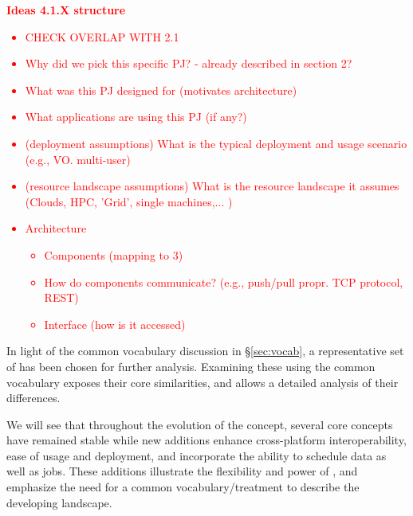 \documentclass{sig-alternate}
\begin{document}
\textcolor{red}
{
\textbf{Ideas 4.1.X structure}
\begin{itemize}
\item CHECK OVERLAP WITH 2.1
\item Why did we pick this specific PJ? - already described in section 2?
\item What was this PJ designed for (motivates architecture)
\item What applications are using this PJ (if any?)
\item (deployment assumptions) What is the typical deployment and usage scenario (e.g., VO. multi-user)
\item (resource landscape assumptions) What is the resource landscape it assumes (Clouds, HPC, 'Grid', single machines,... )
\item Architecture
  \begin{itemize}
    \item Components (mapping to 3)
    \item How do components communicate? (e.g., push/pull propr. TCP protocol, REST)
    \item Interface (how is it accessed)
  \end{itemize}
\end{itemize}
}


In light of the common vocabulary discussion in \S\ref{sec:vocab}, a
representative set of \pilotjobs has been chosen for further analysis.
Examining these \pilotjobs using the common vocabulary exposes their
core similarities, and allows a detailed analysis of their
differences.

We will see that throughout the evolution of the \pilotjob concept,
several core concepts have remained stable while new additions enhance
cross-platform interoperability, ease of usage and deployment, and
incorporate the ability to schedule data as well as jobs.  These
additions illustrate the flexibility and power of \pilotjobs, and
emphasize the need for a common vocabulary/treatment to describe the
developing landscape.


\end{document}
